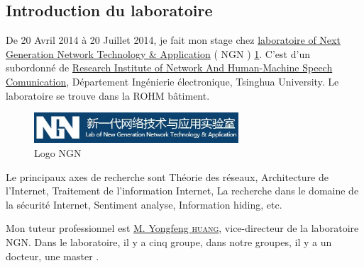 \subsection{Introduction du laboratoire}
 De 20 Avril 2014 à 20 Juillet 2014, je fait mon stage chez \href{http://203.91.121.76/joomla/}{laboratoire of Next Generation Network Technology \& Application} \textsf{( NGN )} \ref{Logo NGN}. C'est d'un subordonné de \href{http://www.ee.tsinghua.edu.cn/publish/eeen/3776/index.html}{Research Institute of Network And Human-Machine Speech Comunication}, Département Ingénierie électronique, Tsinghua University. Le laboratoire se trouve dans la ROHM bâtiment.
  \begin{figure}[H]
      \centering
      \includegraphics[width=3in]{images/NGN.jpg}
      \caption{Logo NGN}
      \label{Logo NGN}
  \end{figure}
Le principaux axes de recherche sont Théorie des réseaux, Architecture de l'Internet, Traitement de l'information Internet, La recherche dans le domaine de la sécurité Internet, Sentiment analyse, Information hiding, etc.

 Mon tuteur professionnel est \href{http://203.91.121.76/joomla/index.php/staff/teacher/83-huangyongfeng}{M. Yongfeng \textsc{huang}}, vice-directeur de la laboratoire NGN. Dans le laboratoire, il y a cinq groupe, dans notre groupes, il y a un docteur, une master .











